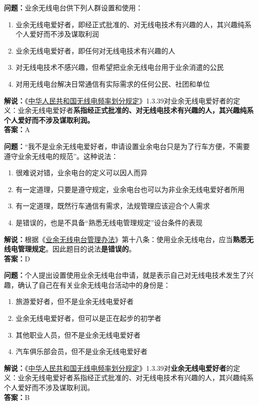 \textbf{问题：}业余无线电台供下列人群设置和使用：
\begin{enumerate}[label=\Alph*), leftmargin=1.5cm]
	\item 业余无线电爱好者，即经正式批准的、对无线电技术有兴趣的人，其兴趣纯系个人爱好而不涉及谋取利润
	\item 业余无线电爱好者，即任何对无线电技术有兴趣的人
	\item 对无线电技术不感兴趣，但希望把业余无线电台用于业余消遣的公民
	\item 对用无线电台解决日常通信有实际需求的任何公民、社团和单位
\end{enumerate}
\textbf{解说：}《\href{https://www.miit.gov.cn/zwgk/zcwj/wjfb/txy/art/2020/art_066386284cd2449493586c81ccafed11.html}{中华人民共和国无线电频率划分规定}》1.3.39对业余无线电爱好者的定义：业余无线电爱好者\textbf{系指经正式批准的、对无线电技术有兴趣的人，其兴趣纯系个人爱好而不涉及谋取利润。}\\\textbf{答案：}A


\textbf{问题：}“我不是业余无线电爱好者，申请设置业余电台只是为了行车方便，不需要遵守业余无线电的规范”。这种说法：
\begin{enumerate}[label=\Alph*), leftmargin=1.5cm]
	\item 很难说对错，业余电台的定义可以因人而异
	\item 有一定道理，只要是遵守规定，业余电台也可以为非业余无线电爱好者所用
	\item 有一定道理，既然行车通信有需求，法规管理应该迎合个人需求
	\item 是错误的，也是不具备“熟悉无线电管理规定”设台条件的表现
\end{enumerate}
\textbf{解说：}根据《\href{https://www.miit.gov.cn/jgsj/zfs/bmgz/art/2020/art_147b69815b3641caad9047735f94c860.html}{业余无线电台管理办法}》第十八条：使用业余无线电台，应当\textbf{熟悉无线电管理规定}。因此题目的说法\textbf{是错误的}。\\\textbf{答案：}D


\textbf{问题：}个人提出设置使用业余无线电台申请，就是表示自己对无线电技术发生了兴趣，确认了自己在有关业余无线电台活动中的身份是：
\begin{enumerate}[label=\Alph*), leftmargin=1.5cm]
	\item 旅游爱好者，但不是业余无线电爱好者
	\item 业余无线电爱好者，但可以是正在起步的初学者
	\item 其他职业人员，但不是业余无线电爱好者
	\item 汽车俱乐部会员，但不是业余无线电爱好者
\end{enumerate}
\textbf{解说：}《\href{https://www.miit.gov.cn/zwgk/zcwj/wjfb/txy/art/2020/art_066386284cd2449493586c81ccafed11.html}{中华人民共和国无线电频率划分规定}》1.3.39对\textbf{业余无线电爱好者}的定义：业余无线电爱好者系指经正式批准的、对无线电技术有兴趣的人，其兴趣纯系个人爱好而不涉及谋取利润。\\\textbf{答案：}B


